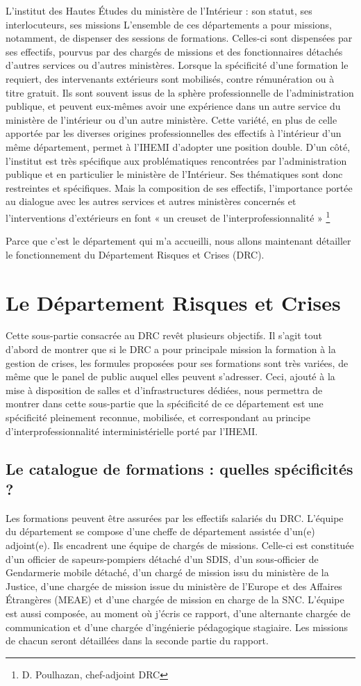 \documentclass[10pt,a4paper]{report} %
\newcommand{\mychapter}[2]{ %
    \setcounter{chapter}{#1}
    \setcounter{section}{0}
    \chapter*{#2}
    \addcontentsline{toc}{chapter}{#2}
}
\begin{document}
\begin{part}{L’institut des Hautes Études du ministère de l’Intérieur : son statut, ses interlocuteurs, ses missions}
L’ensemble de ces départements a pour missions, notamment, de dispenser des sessions de formations. Celles-ci sont dispensées par ses effectifs, pourvus par des chargés de missions et des fonctionnaires détachés d’autres services ou d’autres ministères. Lorsque la spécificité d’une formation le requiert, des intervenants extérieurs sont mobilisés, contre rémunération ou à titre gratuit. Ils sont souvent issus de la sphère professionnelle de l’administration publique, et peuvent eux-mêmes avoir une expérience dans un autre service du ministère de l’intérieur ou d’un autre ministère. Cette variété, en plus de celle apportée par les diverses origines professionnelles des effectifs à l’intérieur d’un même département, permet à l’IHEMI d’adopter une position double. D’un côté, l’institut est très spécifique aux problématiques rencontrées par l’administration publique et en particulier le ministère de l’Intérieur. Ses thématiques sont donc restreintes et spécifiques. Mais la composition de ses effectifs, l’importance portée au dialogue avec les autres services et autres ministères concernés et l’interventions d’extérieurs en font « un creuset de l’interprofessionnalité » \footnote{D. Poulhazan, chef-adjoint DRC}

Parce que c’est le département qui m’a accueilli, nous allons maintenant détailler le fonctionnement du Département Risques et Crises (DRC).

\mychapter{2}{Le Département Risques et Crises}

Cette sous-partie consacrée au DRC revêt plusieurs objectifs. Il s’agit tout d’abord de montrer que si le DRC a pour principale mission la formation à la gestion de crises, les formules proposées pour ses formations sont très variées, de même que le panel de public auquel elles peuvent s’adresser. Ceci, ajouté à la mise à disposition de salles et d’infrastructures dédiées, nous permettra de montrer dans cette sous-partie que la spécificité de ce département est une spécificité pleinement reconnue, mobilisée, et correspondant au principe d’interprofessionnalité interministérielle porté par l’IHEMI.

\section{Le catalogue de formations : quelles spécificités ?}
Les formations peuvent être assurées par les effectifs salariés du DRC. L’équipe du département se compose d’une cheffe de département assistée d’un(e) adjoint(e). Ils encadrent une équipe de chargés de missions. Celle-ci est constituée d’un officier de sapeurs-pompiers détaché d’un SDIS, d’un sous-officier de Gendarmerie mobile détaché, d’un chargé de mission issu du ministère de la Justice, d’une chargée de mission issue du ministère de l’Europe et des Affaires Étrangères (MEAE) et d’une chargée de mission en charge de la SNC. L’équipe est aussi composée, au moment où j’écris ce rapport, d’une alternante chargée de communication et d’une chargée d’ingénierie pédagogique stagiaire. Les missions de chacun seront détaillées dans la seconde partie du rapport.


\end{part}
\end{document}
